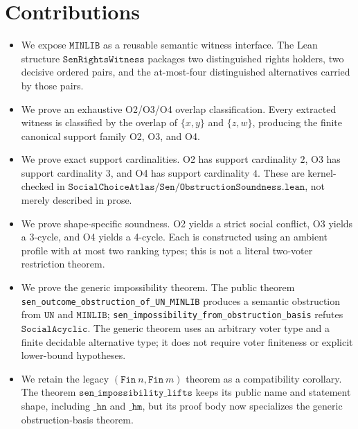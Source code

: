 \section{Contributions}
\label{sec:contributions}

\begin{itemize}[leftmargin=1.5em]
\item We expose \(\mathtt{MINLIB}\) as a reusable semantic witness interface.
  The Lean structure \(\mathtt{SenRightsWitness}\) packages two distinguished rights holders, two decisive ordered pairs, and the at-most-four distinguished alternatives carried by those pairs.

\item We prove an exhaustive O2/O3/O4 overlap classification.
  Every extracted witness is classified by the overlap of \(\{x,y\}\) and \(\{z,w\}\), producing the finite canonical support family O2, O3, and O4.

\item We prove exact support cardinalities.
  O2 has support cardinality \(2\), O3 has support cardinality \(3\), and O4 has support cardinality \(4\).
  These are kernel-checked in \(\mathtt{SocialChoiceAtlas/Sen/ObstructionSoundness.lean}\), not merely described in prose.

\item We prove shape-specific soundness.
  O2 yields a strict social conflict, O3 yields a 3-cycle, and O4 yields a 4-cycle.
  Each is constructed using an ambient profile with at most two ranking types; this is not a literal two-voter restriction theorem.

\item We prove the generic impossibility theorem.
  The public theorem \texttt{sen\_outcome\_obstruction\_}\allowbreak\texttt{of\_UN\_MINLIB} produces a semantic obstruction from \(\mathtt{UN}\) and \(\mathtt{MINLIB}\); \texttt{sen\_impossibility\_}\allowbreak\texttt{from\_obstruction\_basis} refutes \(\mathtt{SocialAcyclic}\).
  The generic theorem uses an arbitrary voter type and a finite decidable alternative type; it does not require voter finiteness or explicit lower-bound hypotheses.

\item We retain the legacy \((\mathtt{Fin}\ n,\mathtt{Fin}\ m)\) theorem as a compatibility corollary.
  The theorem \(\mathtt{sen\_impossibility\_lifts}\) keeps its public name and statement shape, including \(\mathtt{\_hn}\) and \(\mathtt{\_hm}\), but its proof body now specializes the generic obstruction-basis theorem.


\end{itemize}
